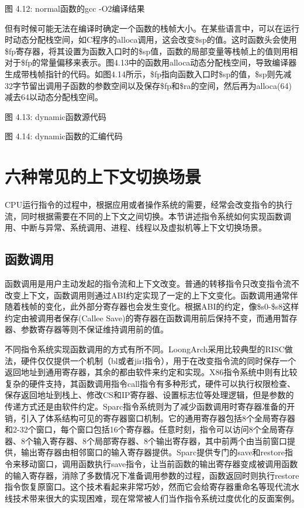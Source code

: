 \documentclass[]{ctexbook}
\begin{document}
图 4.12: normal函数的gcc -O2编译结果

但有时候可能无法在编译时确定一个函数的栈帧大小。在某些语言中，可以在运行时动态分配栈空间，如C程序的alloca调用，这会改变\$sp的值。这时函数头会使用\$fp寄存器，将其设置为函数入口时的\$sp值，函数的局部变量等栈帧上的值则用相对于\$fp的常量偏移来表示。图4.13中的函数用alloca动态分配栈空间，导致编译器生成带栈帧指针的代码。如图4.14所示，\$fp指向函数入口时\$sp的值，\$sp则先减32字节留出调用子函数的参数空间以及保存\$fp和\$ra的空间，然后再为alloca(64)减去64以动态分配栈空间。

图 4.13: dynamic函数源代码

图 4.14: dynamic函数的汇编代码

\hypertarget{ux516dux79cdux5e38ux89c1ux7684ux4e0aux4e0bux6587ux5207ux6362ux573aux666f}{%
\section{六种常见的上下文切换场景}\label{ux516dux79cdux5e38ux89c1ux7684ux4e0aux4e0bux6587ux5207ux6362ux573aux666f}}

CPU运行指令的过程中，根据应用或者操作系统的需要，经常会改变指令的执行流，同时根据需要在不同的上下文之间切换。本节讲述指令系统如何实现函数调用、中断与异常、系统调用、进程、线程以及虚拟机等上下文切换场景。

\hypertarget{ux51fdux6570ux8c03ux7528}{%
\subsection{函数调用}\label{ux51fdux6570ux8c03ux7528}}

函数调用是用户主动发起的指令流和上下文改变。普通的转移指令只改变指令流不改变上下文，函数调用则通过ABI约定实现了一定的上下文变化。函数调用通常伴随着栈帧的变化，此外部分寄存器也会发生变化。根据ABI的约定，像\$s0-\$s8这样约定由被调用者保存(Callee Save)的寄存器在函数调用前后保持不变，而通用暂存器、参数寄存器等则不保证维持调用前的值。

不同指令系统实现函数调用的方式有所不同。LoongArch采用比较典型的RISC做法，硬件仅仅提供一个机制（bl或者jirl指令），用于在改变指令流的同时保存一个返回地址到通用寄存器，其余的都由软件来约定和实现。X86指令系统中则有比较复杂的硬件支持，其函数调用指令call指令有多种形式，硬件可以执行权限检查、保存返回地址到栈上、修改CS和IP寄存器、设置标志位等处理逻辑，但是参数的传递方式还是由软件约定。Sparc指令系统则为了减少函数调用时寄存器准备的开销，引入了体系结构可见的寄存器窗口机制。它的通用寄存器包括8个全局寄存器和2-32个窗口，每个窗口包括16个寄存器。任意时刻，指令可以访问8个全局寄存器、8个输入寄存器、8个局部寄存器、8个输出寄存器，其中前两个由当前窗口提供，输出寄存器由相邻窗口的输入寄存器提供。Sparc提供专门的save和restore指令来移动窗口，调用函数执行save指令，让当前函数的输出寄存器变成被调用函数的输入寄存器，消除了多数情况下准备调用参数的过程，函数返回时则执行restore指令恢复原窗口。这个技术看起来非常巧妙，然而它会给寄存器重命名等现代流水线技术带来很大的实现困难，现在常常被人们当作指令系统过度优化的反面案例。
\end{document}
